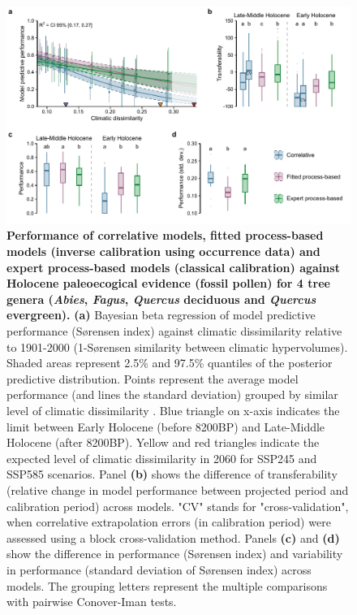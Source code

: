 \documentclass[pdflatex, sn-nature]{sn-jnl}%
\begin{document}
\begin{itemize}
\begin{figure}[ht]
\centering
\hspace*{-0.8in}
\includegraphics[scale=0.9]{past_performance.pdf}
\caption{\textbf{Performance of correlative models, fitted process-based models (inverse calibration using occurrence data) and expert process-based models (classical calibration) against Holocene paleoecogical evidence (fossil pollen) for 4 tree genera (\emph{Abies}, \emph{Fagus}, \emph{Quercus} deciduous and \emph{Quercus} evergreen).} \textbf{(a)} Bayesian beta regression of model predictive performance (Sørensen index) against climatic dissimilarity relative to 1901-2000 (1-Sørensen similarity between climatic hypervolumes). Shaded areas represent 2.5\% and 97.5\% quantiles of the posterior predictive distribution. Points represent the average model performance (and lines the standard deviation) grouped by similar level of climatic dissimilarity . Blue triangle on x-axis indicates the limit between Early Holocene (before 8200BP) and Late-Middle Holocene (after 8200BP). Yellow and red triangles indicate the expected level of climatic dissimilarity in 2060 for SSP245 and SSP585 scenarios. Panel \textbf{(b)} shows the difference of transferability (relative change in model performance between projected period and calibration period) across models. "CV" stands for "cross-validation", when correlative extrapolation errors (in calibration period) were assessed using a block cross-validation method. Panels \textbf{(c)} and \textbf{(d)} show the difference in performance (Sørensen index) and variability in performance (standard deviation of Sørensen index) across models. The grouping letters represent the multiple comparisons with pairwise Conover-Iman tests. }\label{past_performance}
\end{figure}


\end{itemize}
\end{document}
